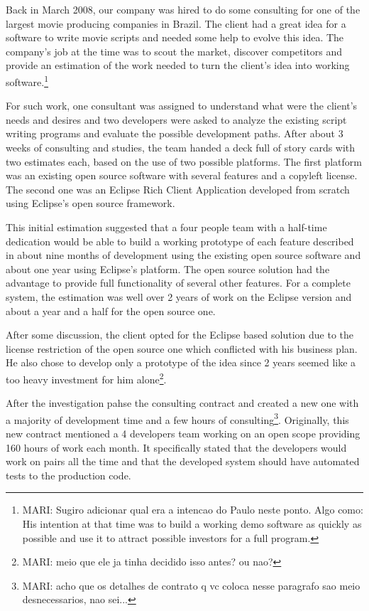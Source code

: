 \documentclass[lnbip]{svmultln}
\newcommand{\mari}[1]{\footnote{MARI: #1}}
\begin{document}
Back in March 2008, our company was hired to do some consulting for
one of the largest movie producing companies in Brazil. The client had
a great idea for a software to write movie scripts and needed some
help to evolve this idea. The company's job at the time was to scout
the market, discover competitors and provide an estimation of the work
needed to turn the client's idea into working software.\mari{Sugiro
  adicionar qual era a intencao do Paulo neste ponto. Algo como: His
  intention at that time was to build a working demo software as
  quickly as possible and use it to attract possible investors for a
  full program.}

For such work, one consultant was assigned to understand what were the
client's needs and desires and two developers were asked to analyze
the existing script writing programs and evaluate the possible
development paths. After about 3 weeks of consulting and studies, the
team handed a deck full of story cards with two estimates each, based
on the use of two possible platforms. The first platform was an
existing open source software with several features and a copyleft
license. The second one was an Eclipse Rich Client Application
developed from scratch using Eclipse's open source framework.

This initial estimation suggested that a four people team with a
half-time dedication would be able to build a working prototype of
each feature described in about nine months of development using the
existing open source software and about one year using Eclipse's
platform. The open source solution had the advantage to provide full
functionality of several other features. For a complete system, the
estimation was well over 2 years of work on the Eclipse version and
about a year and a half for the open source one.

After some discussion, the client opted for the Eclipse based solution
due to the license restriction of the open source one which conflicted
with his business plan. He also chose to develop only a prototype of
the idea since 2 years seemed like a too heavy investment for him
alone\mari{meio que ele ja tinha decidido isso antes? ou nao?}.

After the investigation pahse the consulting contract and created a
new one with a majority of development time and a few hours of
consulting\mari{acho que os detalhes de contrato q vc coloca nesse
  paragrafo sao meio desnecessarios, nao sei...}. Originally, this new
contract mentioned a 4 developers team working on an open scope
providing 160 hours of work each month. It specifically stated that
the developers would work on pairs all the time and that the developed
system should have automated tests to the production code.
\end{document}
